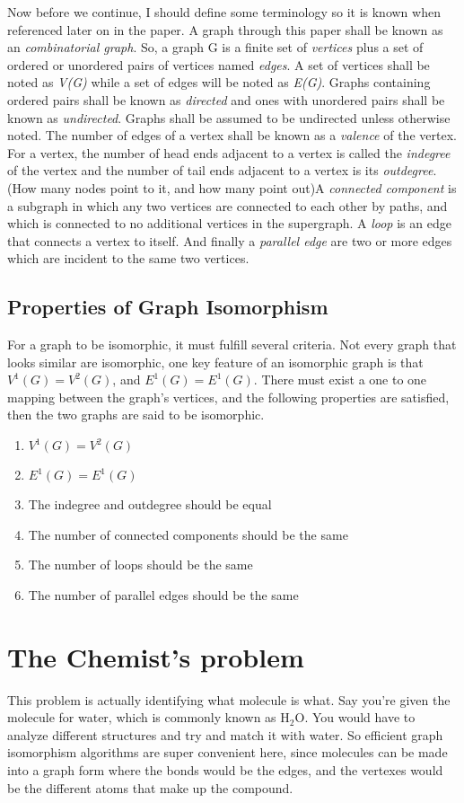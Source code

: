 \documentclass[notitlepage]{report}
\begin{document}
Now before we continue, I should define some terminology so it is known when referenced later on in the paper. A graph through this paper shall be known as an \textit{combinatorial graph}. So, a graph G is a finite set of \textit{vertices} plus a set of ordered or unordered pairs of vertices named \textit{edges}. A set of vertices shall be noted as \textit{V(G)} while a set of edges will be noted as \textit{E(G)}. Graphs containing ordered pairs shall be known as \textit{directed} and ones with unordered pairs shall be known as \textit{undirected}. Graphs shall be assumed to be undirected unless otherwise noted. The number of edges of a vertex shall be known as a \textit{valence} of the vertex. For a vertex, the number of head ends adjacent to a vertex is called the \textit{indegree} of the vertex and the number of tail ends adjacent to a vertex is its \textit{outdegree}. (How many nodes point to it, and how many point out)A \textit{connected component} is a subgraph in which any two vertices are connected to each other by paths, and which is connected to no additional vertices in the supergraph. A \textit{loop} is an edge that connects a vertex to itself. And finally a \textit{parallel edge} are two or more edges which are incident to the same two vertices.

\subsection*{Properties of Graph Isomorphism}
For a graph to be isomorphic, it must fulfill several criteria. Not every graph that looks similar are isomorphic, one key feature of an isomorphic graph is that $V^{1}(G) = V^{2}(G)$, and $E^{1}(G) = E^{1}(G)$. There must exist a one to one mapping between the graph's vertices, and the following properties are satisfied, then the two graphs are said to be isomorphic.

\begin{enumerate}
\item $V^{1}(G) = V^{2}(G)$
\item $E^{1}(G) = E^{1}(G)$
\item The indegree and outdegree should be equal
\item The number of connected components should be the same
\item The number of loops should be the same
\item The number of parallel edges should be the same
\end{enumerate}

\section*{The Chemist's problem}
This problem is actually identifying what molecule is what. Say you're given the molecule for water, which is commonly known as H$_{2}$O. You would have to analyze different structures and try and match it with water. So efficient graph isomorphism algorithms are super convenient here, since molecules can be made into a graph form where the bonds would be the edges, and the vertexes would be the different atoms that make up the compound.~\cite{miller}







\end{document}

